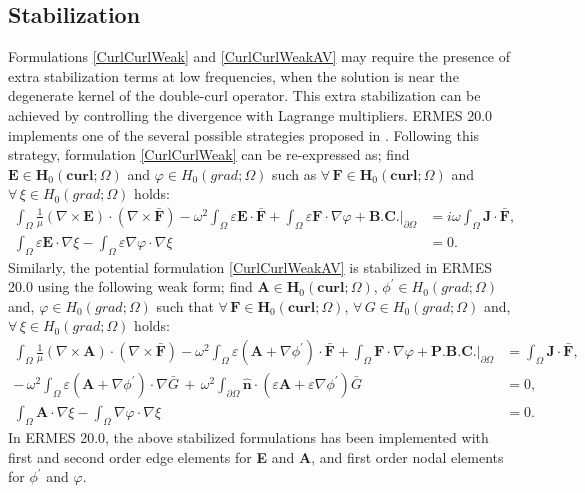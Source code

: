 \subsection{Stabilization}

Formulations \ref{CurlCurlWeak} and \ref{CurlCurlWeakAV} may require the presence of extra stabilization terms at low frequencies, when the solution is near the degenerate kernel of the double-curl operator. This extra stabilization can be achieved by controlling the divergence with Lagrange multipliers. ERMES 20.0 implements one of the several possible strategies proposed in \cite{Monk}. Following this strategy, formulation \ref{CurlCurlWeak} can be re-expressed as; find $\mathbf{E} \in \mathbf{H}_{0}(\mathbf{curl};\Omega)$ and $\varphi \in H_{0}(grad;\Omega)$ such as $\forall\,\mathbf{F} \in \mathbf{H}_{0}(\mathbf{curl};\Omega)$ and $\forall\,\xi \in H_{0}(grad;\Omega)$ holds:
\begin{equation}\label{CurlCurlWeakS}
    \begin{aligned}
	    \int_{\Omega}\frac{1}{\mu}(\nabla\times\mathbf{E})\cdot(\nabla\times\mathbf{\bar{F}}) - \omega^{2}\int_{\Omega}\varepsilon\mathbf{E}\cdot\mathbf{\bar{F}} + \int_{\Omega}\varepsilon\mathbf{F}\cdot\nabla\varphi + \textbf{B.C.}|_{\partial\Omega} &= i\omega\int_{\Omega}\mathbf{J}\cdot\mathbf{\bar{F}},
	    \\
	    \int_{\Omega}\varepsilon\mathbf{E}\cdot\nabla\xi - \int_{\Omega}\varepsilon\nabla\varphi\cdot\nabla\xi &= 0.
    \end{aligned}
\end{equation}
Similarly, the potential formulation \ref{CurlCurlWeakAV} is stabilized in ERMES 20.0 using the following weak form; find $\mathbf{A} \in \mathbf{H}_{0}(\mathbf{curl};\Omega)$, $\phi^{'} \in H_{0}(grad;\Omega)$ and, $\varphi \in H_{0}(grad;\Omega)$ such
that $\forall\,\mathbf{F} \in \mathbf{H}_{0}(\mathbf{curl};\Omega)$, $\forall\,G \in H_{0}(grad;\Omega)$ and, $\forall\,\xi \in H_{0}(grad;\Omega)$ holds:
\begin{equation}\label{CurlCurlWeakAVS2}
	\nonumber
	\begin{aligned}
	    \int_{\Omega}\frac{1}{\mu}(\nabla\times\mathbf{A})\cdot(\nabla\times\mathbf{\bar{F}}) - \omega^{2}\int_{\Omega}\varepsilon\left(\mathbf{A} + \nabla\phi^{'}\right)\cdot\mathbf{\bar{F}} + \int_{\Omega}\mathbf{F}\cdot\nabla\varphi + \textbf{P.B.C.}|_{\partial\Omega} &= \int_{\Omega}\mathbf{J}\cdot\mathbf{\bar{F}},
        \\
        -\,\omega^{2}\int_{\Omega}\varepsilon\left(\mathbf{A} + \nabla\phi^{'}\right)\cdot\nabla\bar{G}\, + \,\omega^{2}\int_{\partial\Omega}\mathbf{\hat{n}}\cdot\left(\varepsilon\mathbf{A} + \varepsilon\nabla\phi^{'}\right)\bar{G}\, &= 0,	
        \\
        \int_{\Omega}\mathbf{A}\cdot\nabla\xi - \int_{\Omega}\nabla\varphi\cdot\nabla\xi &= 0.	
	\end{aligned}
\end{equation}
In ERMES 20.0, the above stabilized formulations has been implemented with first and second order edge elements for \textbf{E} and \textbf{A}, and first order nodal elements for $\phi^{'}$ and $\varphi$.

